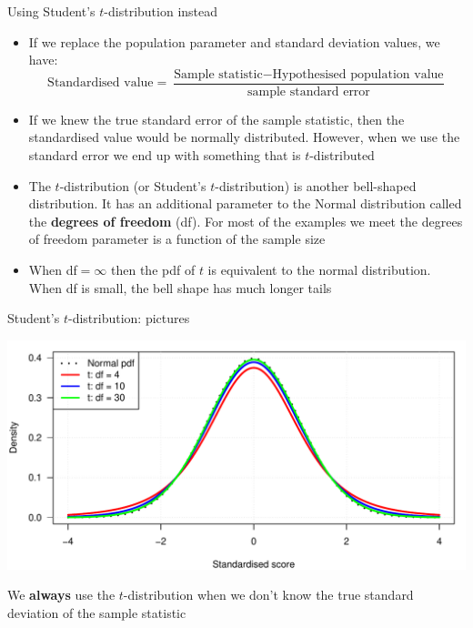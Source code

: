 \documentclass[12pt,xcolor=dvipsnames,handout,mathserif,aspectratio=169]{beamer}
\newcommand{\bre}[1]{{\color{red} \textbf{#1}}}
\begin{document}
\begin{frame}{Using Student's $t$-distribution instead}

\begin{itemize}
\item If we replace the population parameter and standard deviation values, we have:
$$\mbox{Standardised value} = \frac{\mbox{Sample statistic}-\mbox{Hypothesised population value}}{\mbox{sample standard error}}$$
\item If we knew the true standard error of the sample statistic, then the standardised value would be normally distributed. However, when we use the standard error we end up with something that is $t$-distributed
\item The $t$-distribution (or Student's $t$-distribution) is another bell-shaped distribution. It has an additional parameter to the Normal distribution called the \bre{degrees of freedom} (df). For most of the examples we meet the degrees of freedom parameter is a function of the sample size
\item When df$=\infty$ then the pdf of $t$ is equivalent to the normal distribution. When df is small, the bell shape has much longer tails
\end{itemize}
\end{frame}

\begin{frame}{Student's $t$-distribution: pictures}
\begin{center}
\includegraphics[width=\textwidth]{tdists.pdf}
\end{center}
We \bre{always} use the $t$-distribution when we don't know the true standard deviation of the sample statistic
\end{frame}
\end{document}
